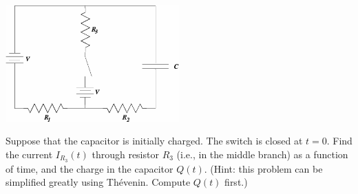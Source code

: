 \documentclass{esg8022pset}
\begin{document}
\begin{problem}{}
  \begin{center}\includegraphics[width=0.5\textwidth]{ps07_07}\end{center}
  Suppose that the capacitor is initially charged.  The switch is closed at $t = 0$.  Find the current $I_{R_3}(t)$ through resistor $R_3$ (i.e., in the middle branch) as a function of time, and the charge in the capacitor $Q(t)$.  (Hint: this problem can be simplified greatly using Th\'evenin.  Compute $Q(t)$ first.)
\end{problem}
\end{document}
